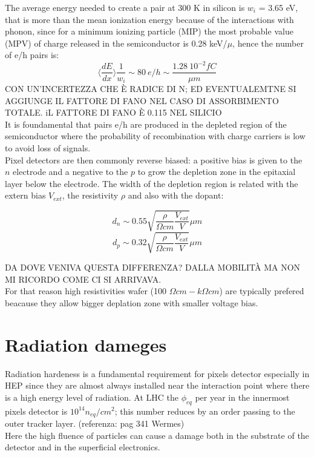     The average energy needed to create a pair at 300 K in silicon is $w_i$ = 3.65 eV, that is more than the mean ionization energy because of the interactions with phonon, since for a minimum ionizing particle (MIP) the most probable value (MPV) of charge released in the semiconductor is 0.28 keV/$\mu$, hence the number of e/h pairs is: 
    \begin{equation}
        \langle \frac{dE}{dx}\rangle \frac{1}{w_i} \sim 80 \: e/h \sim \frac{1.28 \:10^{-2}fC}{\mu m}
    \end{equation}
    CON UN'INCERTEZZA CHE È RADICE DI N; ED EVENTUALEMTNE SI AGGIUNGE IL FATTORE DI FANO NEL CASO DI ASSORBIMENTO TOTALE. iL FATTORE DI FANO È 0.115 NEL SILICIO\\ 
    It is foundamental that pairs e/h are produced in the depleted region of the semiconductor where the probability of recombination with charge carriers is low to avoid loss of signals.\\
    Pixel detectors are then commonly reverse biased: a positive bias is given to the $n$ electrode and a negative to the $p$
    to grow the depletion zone in the epitaxial layer below the electrode. The width of the depletion region is related with the extern bias $V_{ext}$, the resistivity $\rho$ and also with the dopant:
    \begin{multicols}{2}
        \begin{equation}
            d_{n} \sim 0.55 \sqrt{\frac{\rho}{\Omega cm}\frac{V_{ext}}{V}} \mu m 
        \end{equation}\break
        \begin{equation}
            d_{p} \sim 0.32 \sqrt{\frac{\rho}{\Omega cm}\frac{V_{ext}}{V}} \mu m
        \end{equation}
        \label{eq:deplation_d}
    \end{multicols}
    DA DOVE VENIVA QUESTA DIFFERENZA? DALLA MOBILITÀ MA NON MI RICORDO COME CI SI ARRIVAVA.\\
    For that reason high resistivities wafer (100 $\Omega cm - k\Omega cm$) are typically prefered beacause they allow bigger deplation zone with smaller voltage bias. 

\section{Radiation dameges}
    Radiation hardeness is a fundamental requirement for pixels detector especially in HEP since they are almost always installed near the interaction point where there is a high energy level of radiation. At LHC the $\phi_{eq}$ per year in the innermost pixels detector is $10^{14} n_{eq}/cm^2$; this number reduces by an order passing to the outer tracker layer. (referenza: pag 341 Wermes)\\ 
    Here the high fluence of particles can cause a damage both in the substrate of the detector and in the superficial electronics. 
    
